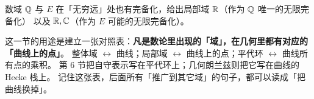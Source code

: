 数域 $\mathbb{Q}$ 与 $E$ 在「无穷远」处也有完备化，给出局部域 $\mathbb{R}$（作为 $\mathbb{Q}$ 唯一的无限完备化）
以及 $\mathbb{R},\mathbb{C}$（作为 $E$ 可能的无限完备化）。

\begin{keytakeaways}
这一节的用途是建立一张对照表：\textbf{凡是数论里出现的「域」，在几何里都有对应的「曲线上的点」}。
整体域 $\leftrightarrow$ 曲线；局部域 $\leftrightarrow$ 曲线上的点；平代环 $\leftrightarrow$ 曲线所有点的乘积。
第 6 节把自守表示写在平代环上；几何朗兰兹则把它写在曲线的 Hecke 栈上。
记住这张表，后面所有「推广到其它域」的句子，都可以读成「把曲线换掉」。
\end{keytakeaways}
